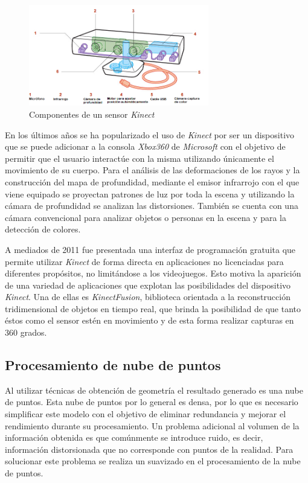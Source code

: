 \begin{figure}[H]
  \centering
    \includegraphics[width=0.7\textwidth]{./Cap2_videomapping/kinect.PNG}
  \caption[http://qph.cf.quoracdn.net/main-qimg-90d9a2ceb96f836e0b724027c2aba723]{Componentes de un sensor \emph{Kinect}}
  \label{fig:Kinect}
\end{figure}

En los últimos años se ha popularizado el uso de \emph{Kinect} por ser un dispositivo que se puede adicionar a la consola \emph{Xbox360} de \emph{Microsoft} con el objetivo de permitir que el usuario interactúe con la misma utilizando únicamente el movimiento de su cuerpo.
Para el análisis de las deformaciones de los rayos y la construcción del mapa de profundidad, mediante el emisor infrarrojo con el que viene equipado se proyectan patrones de luz por toda la escena y utilizando la cámara de profundidad se analizan las distorsiones. También se cuenta con una cámara convencional para analizar objetos o personas en la escena y para la detección de colores.

A mediados de 2011 fue presentada una interfaz de programación gratuita que permite utilizar \emph{Kinect} de forma directa en aplicaciones no licenciadas para diferentes propósitos, no limitándose a los videojuegos. Esto motiva la aparición de una variedad de aplicaciones que explotan las posibilidades del dispositivo \emph{Kinect}. Una de ellas es \emph{KinectFusion}\cite{KinectFusion}, biblioteca orientada a la reconstrucción tridimensional de objetos en tiempo real, que brinda la posibilidad de que tanto éstos como el sensor estén en movimiento y de esta forma realizar capturas en 360 grados.

\subsection{Procesamiento de nube de puntos}

Al utilizar técnicas de obtención de geometría el resultado generado es una nube de puntos. Esta nube de puntos por lo general es densa, por lo que es necesario simplificar este modelo con el objetivo de eliminar redundancia y mejorar el rendimiento durante su procesamiento. Un problema adicional al volumen de la información obtenida es que comúnmente se introduce ruido, es decir, información distorsionada que no corresponde con puntos de la realidad. Para solucionar este problema se realiza un suavizado en el procesamiento de la nube de puntos\cite{PCloudSimplify}.

